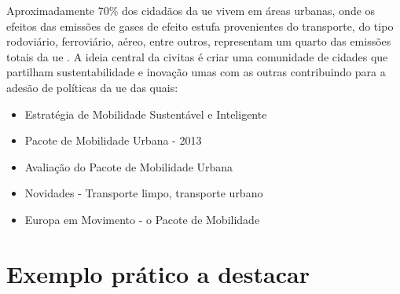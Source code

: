 Aproximadamente 70\% dos cidadãos da \gls{ue} vivem em áreas urbanas, onde os efeitos das emissões de gases de efeito estufa provenientes do transporte, do tipo rodoviário, ferroviário, aéreo, entre outros, representam um quarto das emissões totais da \gls{ue} \cite{CIVITAS_2025}.
A ideia central da \gls{civitas} é criar uma comunidade de cidades que partilham sustentabilidade e inovação umas com as outras contribuindo para a adesão de políticas da \gls{ue}  das quais:
\begin{itemize}
   \item Estratégia de Mobilidade Sustentável e Inteligente
    \item Pacote de Mobilidade Urbana - 2013
    \item Avaliação do Pacote de Mobilidade Urbana
    \item Novidades - Transporte limpo, transporte urbano
    \item Europa em Movimento - o Pacote de Mobilidade
\end{itemize}

\section{Exemplo prático a destacar}
\label{sec:pratical_example}

 



